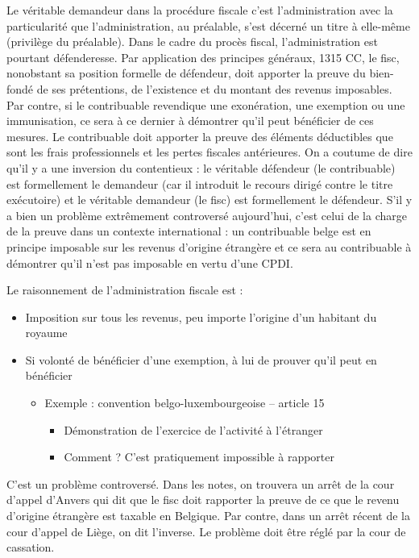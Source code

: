 \documentclass{book}
\begin{document}
Le véritable demandeur dans la procédure fiscale c’est l’administration avec la particularité que l’administration, au préalable, s’est décerné un titre à elle-même (privilège du préalable). Dans le cadre du procès fiscal, l’administration est pourtant défenderesse. Par application des principes généraux, 1315 CC, le fisc, nonobstant sa position formelle de défendeur, doit apporter la preuve du bien-fondé de ses prétentions, de l’existence et du montant des revenus imposables. 
Par contre, si le contribuable revendique une exonération, une exemption ou une immunisation, ce sera à ce dernier à démontrer qu’il peut bénéficier de ces mesures. Le contribuable doit apporter la preuve des éléments déductibles que sont les frais professionnels et les pertes fiscales antérieures. 
On a coutume de dire qu’il y a une inversion du contentieux : le véritable défendeur (le contribuable) est formellement le demandeur (car il introduit le recours dirigé contre le titre exécutoire) et le véritable demandeur (le fisc) est formellement le défendeur. 
S’il y a bien un problème extrêmement controversé aujourd’hui, c’est celui de la charge de la preuve dans un contexte international : un contribuable belge est en principe imposable sur les revenus d’origine étrangère et ce sera au contribuable à démontrer qu’il n’est pas imposable en vertu d’une CPDI. 

Le raisonnement de l’administration fiscale est : 
\begin{itemize}
\item Imposition sur tous les revenus, peu importe l’origine d’un habitant du royaume 
\item Si volonté de bénéficier d’une exemption, à lui de prouver qu’il peut en bénéficier 

\begin{itemize}
\item Exemple : convention belgo-luxembourgeoise – article 15 
\begin{itemize}
\item Démonstration de l’exercice de l’activité à l’étranger 
\item Comment ? C’est pratiquement impossible à rapporter 
\end{itemize}
\end{itemize}
\end{itemize}

C’est un problème controversé. 
Dans les notes, on trouvera un arrêt de la cour d’appel d’Anvers qui dit que le fisc doit rapporter la preuve de ce que le revenu d’origine étrangère est taxable en Belgique. Par contre, dans un arrêt récent de la cour d’appel de Liège, on dit l’inverse. Le problème doit être réglé par la cour de cassation.  
\end{document}

